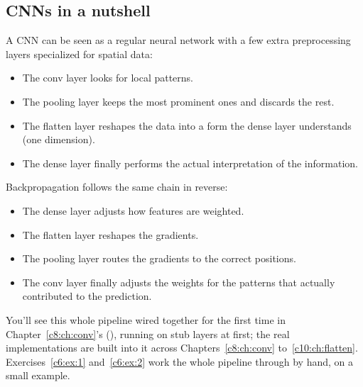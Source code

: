 \subsection{CNNs in a nutshell}
A CNN can be seen as a regular neural network with a few extra preprocessing layers specialized for
spatial data:
\begin{itemize}
  \item The conv layer looks for local patterns.
  \item The pooling layer keeps the most prominent ones and discards the rest.
  \item The flatten layer reshapes the data into a form the dense layer understands (one
    dimension).
  \item The dense layer finally performs the actual interpretation of the information.
\end{itemize}
Backpropagation follows the same chain in reverse:
\begin{itemize}
  \item The dense layer adjusts how features are weighted.
  \item The flatten layer reshapes the gradients.
  \item The pooling layer routes the gradients to the correct positions.
  \item The conv layer finally adjusts the weights for the patterns that actually contributed to
    the prediction.
\end{itemize}
You'll see this whole pipeline wired together for the first time in Chapter~\ref{c8:ch:conv}'s
 (), running on stub layers at first; the real
implementations are built into it across Chapters~\ref{c8:ch:conv} to~\ref{c10:ch:flatten}.
Exercises~\ref{c6:ex:1} and~\ref{c6:ex:2} work the whole pipeline through by hand, on a small
example.
